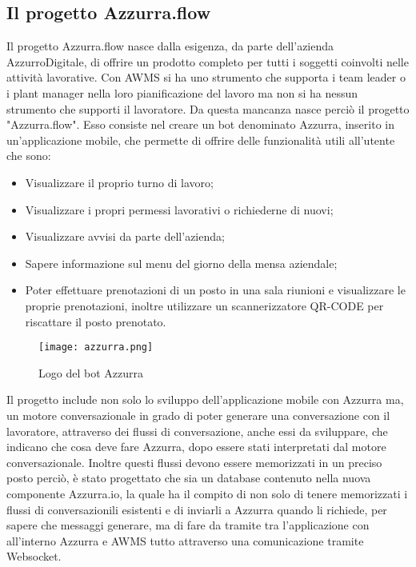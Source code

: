 \subsection{Il progetto Azzurra.flow}

Il progetto Azzurra.flow nasce dalla esigenza, da parte dell'azienda AzzurroDigitale, di offrire un prodotto completo per tutti i soggetti coinvolti nelle attività lavorative. Con AWMS si ha uno strumento che supporta i team leader o i plant manager nella loro pianificazione del lavoro ma non si ha nessun strumento che supporti il lavoratore. Da questa mancanza nasce perciò il progetto "Azzurra.flow". Esso consiste nel creare un bot denominato Azzurra, inserito in un’applicazione mobile, che permette di offrire delle funzionalità utili all'utente che sono:
\begin{itemize}
	\item Visualizzare il proprio turno di lavoro;
	\item Visualizzare i propri permessi lavorativi o richiederne di nuovi;
	\item Visualizzare avvisi da parte dell'azienda;
	\item Sapere informazione sul menu del giorno della mensa aziendale;
	\item Poter effettuare prenotazioni di un posto in una sala riunioni e visualizzare le proprie prenotazioni, inoltre utilizzare un scannerizzatore QR-CODE per riscattare il posto prenotato.
\end{itemize}
	\begin{figure}[!h] 
	\begin{center}
		\texttt{[image: azzurra.png]}
		\caption{Logo del bot Azzurra}
	\end{center}
\end{figure}
Il progetto include non solo lo sviluppo dell'applicazione mobile con Azzurra ma, un motore conversazionale in grado di poter generare una conversazione con il lavoratore, attraverso dei flussi di conversazione, anche essi da sviluppare, che indicano che cosa deve fare Azzurra, dopo essere stati interpretati dal motore conversazionale. Inoltre questi flussi devono essere memorizzati in un preciso posto perciò, è stato progettato che sia un database contenuto nella nuova componente Azzurra.io, la quale ha il compito di non solo di tenere memorizzati i flussi di conversazionili esistenti e di inviarli a Azzurra quando li richiede, per sapere che messaggi generare, ma di fare da tramite tra l'applicazione con all'interno Azzurra e AWMS tutto attraverso una comunicazione tramite Websocket.
